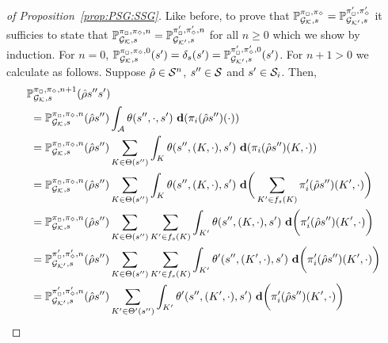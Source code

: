 \begin{proof}[of Proposition~\ref{prop:PSG:SSG}]
  Like before, to prove that
  $\mathbb{P}^{\pi_{{\Box}},\pi_{{\Diamond}}}_{{\mathcal{G}_{\mathcal{K}}},s}=\mathbb{P}^{\pi'_{{\Box}},\pi'_{{\Diamond}}}_{{\mathcal{G}_{\mathcal{K}'}},s}$
  it sufficies to state that
  $\mathbb{P}^{\pi_{{\Box}},\pi_{{\Diamond}},n}_{{\mathcal{G}_{\mathcal{K}}},s}=\mathbb{P}^{\pi'_{{\Box}},\pi'_{{\Diamond}},n}_{{\mathcal{G}_{\mathcal{K}'}},s}$
  for all $n\geq0$ which we show by induction.
  For $n=0$,
  $\mathbb{P}^{\pi_{{\Box}},\pi_{{\Diamond}},0}_{{\mathcal{G}_{\mathcal{K}}},s}(s')=\delta_{s}(s')=\mathbb{P}^{\pi'_{{\Box}},\pi'_{{\Diamond}},0}_{{\mathcal{G}_{\mathcal{K}'}},s}(s')$.
  For $n+1>0$ we calculate as follows.  Suppose
  $\hat{\rho}\in\mathcal{S}^n$, $s''\in\mathcal{S}$ and $s'\in\mathcal{S}_{i}$.
  Then,
  \begin{align}
    &\!\!
    \Prob^{\strat_{\maxplay},\strat_{\minplay},n+1}_{\StochGK,s}(\hat{\rho} s'' s')
    \notag\\
    & =
    \Prob^{\strat_{\maxplay},\strat_{\minplay},n}_{\StochGK,s}(\hat{\rho}s'')\int_{\sgactions}\sgtrans(s'',\cdot,s')\ \diff(\strat_{i}(\hat{\rho}s'')(\cdot))
    \label{eq:strat:psg:prob:i}\\
    & =
    \Prob^{\strat_{\maxplay},\strat_{\minplay},n}_{\StochGK,s}(\hat{\rho}s'')\sum_{K\in\psgtrans(s'')}\int_{K}\sgtrans(s'',(K,\cdot),s')\ \diff(\strat_{i}(\hat{\rho}s'')(K,\cdot))
    \label{eq:strat:psg:prob:ii}\\
    & =
    \Prob^{\strat_{\maxplay},\strat_{\minplay},n}_{\StochGK,s}(\hat{\rho}s'')\sum_{K\in\psgtrans(s'')}\int_{K}\sgtrans(s'',(K,\cdot),s')\ \diff\bigg(\sum_{K'\in f_{s}(K)} \strat'_{i}(\hat{\rho}s'')(K',\cdot)\bigg)
    \label{eq:strat:psg:prob:iii}\\
    & =
    \Prob^{\strat_{\maxplay},\strat_{\minplay},n}_{\StochGK,s}(\hat{\rho}s'')\sum_{K\in\psgtrans(s'')}\sum_{K'\in f_{s}(K)} \int_{K'}\sgtrans(s'',(K,\cdot),s')\ \diff\bigg(\strat'_{i}(\hat{\rho}s'')(K',\cdot)\bigg)
    \label{eq:strat:psg:prob:iv}\\
    & =
    \Prob^{\strat'_{\maxplay},\strat'_{\minplay},n}_{\StochGKp,s}(\hat{\rho}s'')\sum_{K\in\psgtrans(s'')}\sum_{K'\in f_{s}(K)} \int_{K'}\sgtrans'(s'',(K',\cdot),s')\ \diff\bigg(\strat'_{i}(\hat{\rho}s'')(K',\cdot)\bigg)
    \label{eq:strat:psg:prob:v}\\
    & =
    \Prob^{\strat'_{\maxplay},\strat'_{\minplay},n}_{\StochGKp,s}(\hat{\rho}s'')\sum_{K'\in\psgtrans'(s'')} \int_{K'}\sgtrans'(s'',(K',\cdot),s')\ \diff\bigg(\strat'_{i}(\hat{\rho}s'')(K',\cdot)\bigg)

\end{align}
\end{proof}
